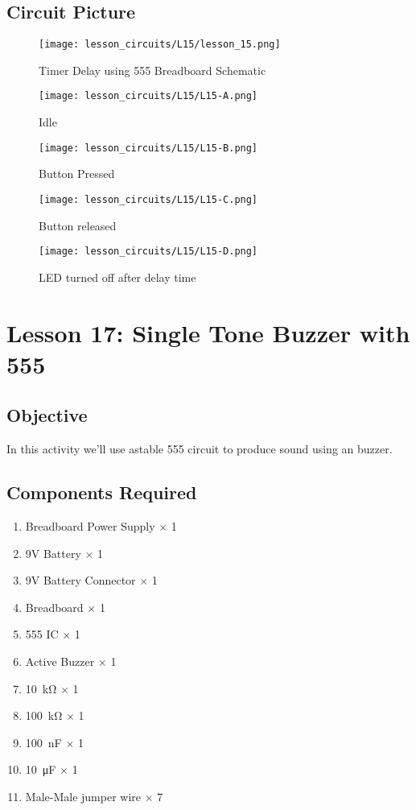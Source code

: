 \subsection{Circuit Picture}
\begin{figure}[!hp]
    \centering
    \texttt{[image: lesson\_circuits/L15/lesson\_15.png]}
    \caption{Timer Delay using 555 Breadboard Schematic}
    \label{fig:555_timer_sch}
\end{figure}
\begin{figure}[!hp]
    \centering
    \texttt{[image: lesson\_circuits/L15/L15-A.png]}
    \caption{Idle}
    \label{fig:555_timer_obb}
\end{figure}
\begin{figure}[!hp]
    \centering
    \texttt{[image: lesson\_circuits/L15/L15-B.png]}
    \caption{Button Pressed}
    \label{fig:555_timer_obb1}
\end{figure}
\begin{figure}[!hp]
    \centering
    \texttt{[image: lesson\_circuits/L15/L15-C.png]}
    \caption{Button released}
    \label{fig:555_timer_obb2}
\end{figure}
\begin{figure}[!hp]
    \centering
    \texttt{[image: lesson\_circuits/L15/L15-D.png]}
    \caption{LED turned off after delay time}
    \label{fig:555_timer_obb3}
\end{figure}
\section{Lesson 17: Single Tone Buzzer with 555}
\subsection{Objective}
In this activity we'll use astable 555 circuit to produce sound using an buzzer.
\subsection{Components Required}
\begin{enumerate}
    \item Breadboard Power Supply $\times$ 1
    \item 9V Battery $\times$ 1
    \item 9V Battery Connector $\times$ 1
    \item Breadboard $\times$ 1
    \item 555 IC $\times$ 1
    \item Active Buzzer $\times$ 1
    \item \SI{10}{\kilo\ohm} $\times$ 1
    \item \SI{100}{\kilo\ohm} $\times$ 1
    \item \SI{100}{\nano\farad} $\times$ 1
    \item \SI{10}{\micro\farad} $\times$ 1
    \item Male-Male jumper wire $\times$ 7
\end{enumerate}
